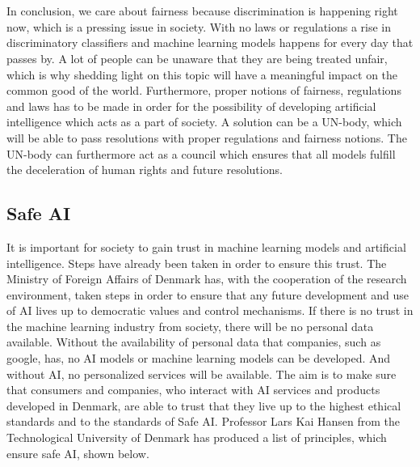 \documentclass[11pt, fleqn, titlepage]{article}
\begin{document}
	\\\\
	In conclusion, we care about fairness because discrimination is happening right now, which is a pressing issue in society. With no laws or regulations a rise in discriminatory classifiers and machine learning models happens for every day that passes by. A lot of people can be unaware that they are being treated unfair, which is why shedding light on this topic will have a meaningful impact on the common good of the world. Furthermore, proper notions of fairness, regulations and laws has to be made in order for the possibility of developing artificial intelligence which acts as a part of society. A solution can be a UN-body, which will be able to pass resolutions with proper regulations and fairness notions. The UN-body can furthermore act as a council which ensures that all models fulfill the deceleration of human rights and future resolutions. 
	
	
	
	
	\subsection{Safe AI}\label{safeai}
	It is important for society to gain trust in machine learning models and artificial intelligence. Steps have already been taken in order to ensure this trust. The Ministry of Foreign Affairs of Denmark has, with the cooperation of the research environment, taken steps in order to ensure that any future development and use of AI lives up to democratic values and control mechanisms. If there is no trust in the machine learning industry from society, there will be no personal data available. Without the availability of personal data that companies, such as google, has, no AI models or machine learning models can be developed. And without AI, no personalized services will be available. The aim is to make sure that consumers and companies, who interact with AI services and products developed in Denmark, are able to trust that they live up to the highest ethical standards and to the standards of Safe AI. \cite{larsk} Professor Lars Kai Hansen from the Technological University of Denmark has produced a list of principles, which ensure safe AI, shown  below. 
	
\end{document}
